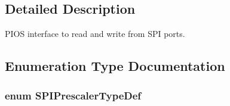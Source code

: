 \subsection{\-Detailed \-Description}
\-P\-I\-O\-S interface to read and write from \-S\-P\-I ports. 

\subsection{\-Enumeration \-Type \-Documentation}
\hypertarget{group___p_i_o_s___s_p_i_gacc2b1ca1c7cd8aeef04fee955ef7ffd2}{
\subsubsection[{\-S\-P\-I\-Prescaler\-Type\-Def}]{\setlength{\rightskip}{0pt plus 5cm}enum {\bf \-S\-P\-I\-Prescaler\-Type\-Def}}}\label{group___p_i_o_s___s_p_i_gacc2b1ca1c7cd8aeef04fee955ef7ffd2}
